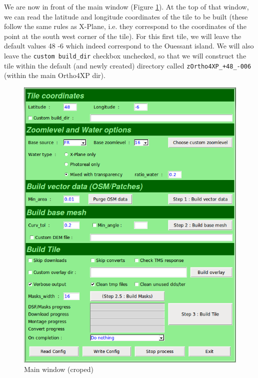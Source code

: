 \documentclass[12pt]{article}
\begin{document}
We are now in front of the main window (Figure \ref{fig:main_window}). At the top of that window, we can read the latitude and longitude coordinates of the tile to be built (these follow the same rules as X-Plane, i.e. they correspond to the coordinates of the point at the south west corner of the tile). For this first tile, we will leave the default values 48 -6 which indeed correspond to the Ouessant island. We will also leave the {\tt custom build\_dir} checkbox unchecked, so that we will construct the tile within the default (and newly created) directory called {\tt zOrtho4XP\_+48\_-006} (within the main Ortho4XP dir).
\begin{center}
\begin{figure}[!ht]
\begin{center}
\includegraphics[width=14cm]{Images/main_window.png}
\caption{\label{fig:main_window}Main window (croped)}
\end{center}
\end{figure}
\end{center}
\end{document}
